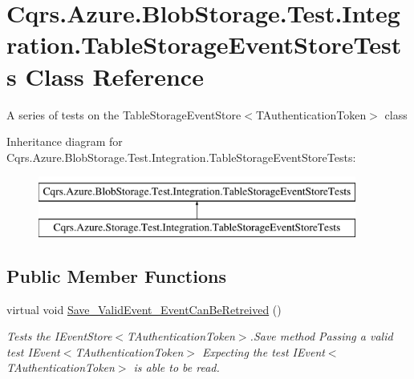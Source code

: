 \hypertarget{classCqrs_1_1Azure_1_1BlobStorage_1_1Test_1_1Integration_1_1TableStorageEventStoreTests}{}\section{Cqrs.\+Azure.\+Blob\+Storage.\+Test.\+Integration.\+Table\+Storage\+Event\+Store\+Tests Class Reference}
\label{classCqrs_1_1Azure_1_1BlobStorage_1_1Test_1_1Integration_1_1TableStorageEventStoreTests}


A series of tests on the Table\+Storage\+Event\+Store$<$\+T\+Authentication\+Token$>$ class  


Inheritance diagram for Cqrs.\+Azure.\+Blob\+Storage.\+Test.\+Integration.\+Table\+Storage\+Event\+Store\+Tests\+:\begin{figure}[H]
\begin{center}
\leavevmode
\includegraphics[height=2.000000cm]{classCqrs_1_1Azure_1_1BlobStorage_1_1Test_1_1Integration_1_1TableStorageEventStoreTests}
\end{center}
\end{figure}
\subsection*{Public Member Functions}
\begin{DoxyCompactItemize}
\item 
virtual void \hyperlink{classCqrs_1_1Azure_1_1BlobStorage_1_1Test_1_1Integration_1_1TableStorageEventStoreTests_a0f88e64f7ff8f84b308d4a8c78222b7e_a0f88e64f7ff8f84b308d4a8c78222b7e}{Save\+\_\+\+Valid\+Event\+\_\+\+Event\+Can\+Be\+Retreived} ()
\begin{DoxyCompactList}\small\item\em Tests the I\+Event\+Store$<$\+T\+Authentication\+Token$>$.\+Save method Passing a valid test I\+Event$<$\+T\+Authentication\+Token$>$ Expecting the test I\+Event$<$\+T\+Authentication\+Token$>$ is able to be read. \end{DoxyCompactList}\end{DoxyCompactItemize}
